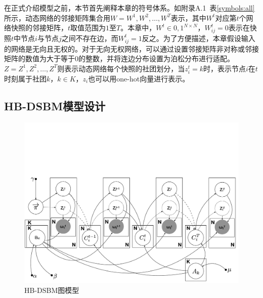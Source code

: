 在正式介绍模型之前，本节首先阐释本章的符号体系。如附录A.1~表\ref{symbols:all}所示，动态网络的邻接矩阵集合用$W={W^1, W^2, \dots, W^T}$表示，其中$W^t$对应第$t$个网络快照的邻接矩阵，$t$取值范围为$1$至$T$。本章中，$W^t \in {0,1}^{N \times N}$，$W_{ij}^t = 0$表示在快照$t$中节点$i$与节点$j$之间不存在边，而$W_{ij}^t = 1$反之。为了方便描述，本章假设输入的网络是无向且无权的。对于无向无权网络，可以通过设置邻接矩阵非对称或邻接矩阵的数值为大于等于$0$的整数，并将连边分布设置为泊松分布进行适配。$Z = {Z^1, Z^2, \dots, Z^T}$则表示动态网络每个快照的社团划分，当$z_i^t = k$时，表示节点$i$在$t$时刻属于社团$k$，$k \in K$，$z_i$也可以用one-hot向量进行表示。

\subsection{HB-DSBM模型设计}

\begin{figure}[!htbp]
	\setlength{\abovecaptionskip}{0pt} 
	\setlength{\belowcaptionskip}{10pt} 
	\includegraphics[width=.9\textwidth]{figures/chap04/graph-model_v3_cuted.pdf}
	\caption{HB-DSBM图模型}
	\label{fig.4.1}
\end{figure}



